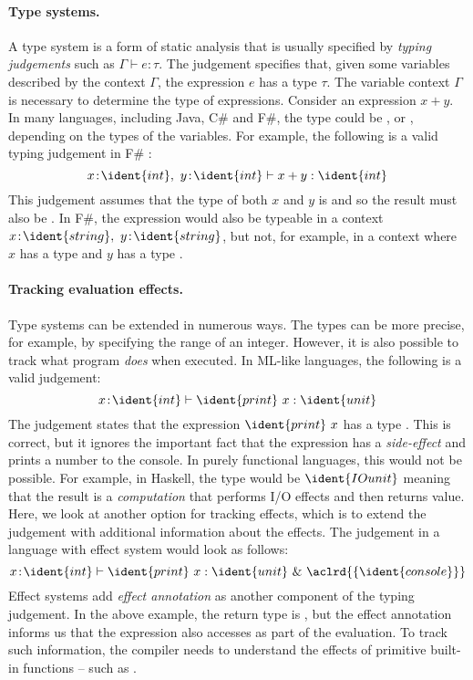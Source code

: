 \paragraph{Type systems.}
A type system is a form of static analysis that is usually specified by \emph{typing judgements}
such as $\Gamma \vdash e : \tau$. The judgement specifies that, given some variables described by
the context $\Gamma$, the expression $e$ has a type $\tau$.
The variable context $\Gamma$ is necessary to determine the type of expressions. Consider an
expression $x + y$. In many languages, including Java, C\# and F\#, the type could be ,
 or , depending on the types of the variables. For example,
the following is a valid typing judgement in F\# \cite{app-fsharp}:
%
\begin{equation*}
x\!:\!\ident{int},~y\!:\!\ident{int} \vdash x+y : \ident{int}
\end{equation*}
%
This judgement assumes that the type of both $x$ and $y$ is  and so the result must also
be . In F\#, the expression would also be typeable in a context $x\!:\!\ident{string},~y\!:\!\ident{string}$,
but not, for example, in a context where $x$ has a type  and $y$ has a type .

\paragraph{Tracking evaluation effects.}
Type systems can be extended in numerous ways. The types can be more precise, for example, by specifying
the range of an integer. However, it is also possible to track what program \emph{does} when executed.
In ML-like languages, the following is a valid judgement:
%
\begin{equation*}
x\!:\!\ident{int} \vdash \ident{print}~x : \ident{unit}
\end{equation*}
%
The judgement states that the expression $\ident{print}~x$ has a type . This is correct,
but it ignores the important fact that the expression has a \emph{side-effect} and prints a number
to the console. In purely functional languages, this would not be possible. For example, in Haskell,
the type would be $\ident{IO unit}$ meaning that the result is a \emph{computation} that performs I/O
effects and then returns  value. Here, we look at another option for tracking effects,
which is to extend the judgement with additional information about the effects. The judgement in a
language with effect system would look as follows:
%
\begin{equation*}
x\!:\!\ident{int} \vdash \ident{print}~x : \ident{unit}~\&~\aclrd{\{ \ident{console} \}}
\end{equation*}
%
Effect systems add \emph{effect annotation} as another component of the typing judgement. In the above
example, the return type is , but the effect annotation informs us that the expression
also accesses  as part of the evaluation. To track such information, the compiler needs
to understand the effects of primitive built-in functions -- such as .

